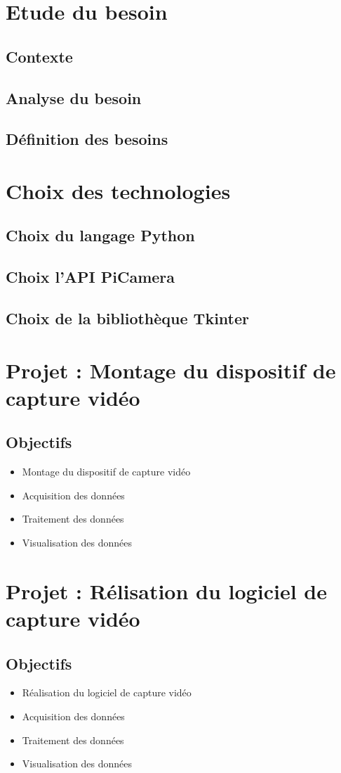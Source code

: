     \section{Etude du besoin}
    \subsection{Contexte}
    \subsection{Analyse du besoin}
    \subsection{Définition des besoins}

    \section{Choix des technologies}
    \subsection{Choix du langage Python}
    \subsection{Choix l'API PiCamera}
    \subsection{Choix de la bibliothèque Tkinter}
    \section{Projet : Montage du dispositif de capture vidéo}

    \subsection{Objectifs}
        \begin{itemize}
            \item Montage du dispositif de capture vidéo
            \item Acquisition des données
            \item Traitement des données
            \item Visualisation des données
        \end{itemize}


    \section{Projet : Rélisation du logiciel de capture vidéo}
    \subsection{Objectifs}
        \begin{itemize}
            \item Réalisation du logiciel de capture vidéo
            \item Acquisition des données
            \item Traitement des données
            \item Visualisation des données
        \end{itemize}